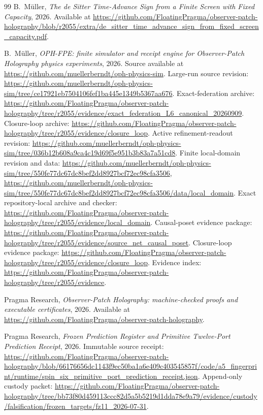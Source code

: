 \begin{thebibliography}{99}
B.~M\"uller,
\emph{The de Sitter Time-Advance Sign from a Finite Screen with Fixed Capacity},
2026.
Available at
\url{https://github.com/FloatingPragma/observer-patch-holography/blob/r2055/extra/de_sitter_time_advance_sign_from_fixed_screen_capacity.pdf}.

B.~M\"uller,
\emph{OPH-FPE: finite simulator and receipt engine for Observer-Patch Holography physics experiments},
2026.
Source available at \url{https://github.com/muellerberndt/oph-physics-sim}.
Large-run source revision:
\url{https://github.com/muellerberndt/oph-physics-sim/tree/ce17921eb7504106fef1ba445e1349b5367aa676}.
Exact-federation archive:
\url{https://github.com/FloatingPragma/observer-patch-holography/tree/r2055/evidence/exact_federation_L6_canonical_20260909}.
Closure-loop archive:
\url{https://github.com/FloatingPragma/observer-patch-holography/tree/r2055/evidence/closure_loop}.
Active refinement-readout revision:
\url{https://github.com/muellerberndt/oph-physics-sim/tree/036b12b608a9ca4c19d69f5e951b3b83a7a51cd8}.
Finite local-domain revision and data:
\url{https://github.com/muellerberndt/oph-physics-sim/tree/550fe77dc67dc8bef2dd8927bcf72ec98cfa3506},
\url{https://github.com/muellerberndt/oph-physics-sim/tree/550fe77dc67dc8bef2dd8927bcf72ec98cfa3506/data/local_domain}.
Exact repository-local archive and checker:
\url{https://github.com/FloatingPragma/observer-patch-holography/tree/r2055/evidence/local_domain}.
Causal-poset evidence package:
\url{https://github.com/FloatingPragma/observer-patch-holography/tree/r2055/evidence/source_net_causal_poset}.
Closure-loop evidence package:
\url{https://github.com/FloatingPragma/observer-patch-holography/tree/r2055/evidence/closure_loop}.
Evidence index:
\url{https://github.com/FloatingPragma/observer-patch-holography/tree/r2055/evidence}.

Pragma Research,
\emph{Observer-Patch Holography: machine-checked proofs and executable certificates},
2026.
Available at \url{https://github.com/FloatingPragma/observer-patch-holography}.

Pragma Research,
\emph{Frozen Prediction Register and Primitive Twelve-Port Prediction Receipt},
2026.
Immutable source receipt:
\url{https://github.com/FloatingPragma/observer-patch-holography/blob/66176656dc1143f9ec50ba1a6e409c403545857f/code/a5_fingerprint/runtime/spin_six_primitive_port_prediction_receipt.json}.
Append-only custody packet:
\url{https://github.com/FloatingPragma/observer-patch-holography/tree/bb73f80d459113ccc82d5a5b5219d1dda78e9a79/evidence/custody/falsification/frozen_targets/fz11_2026-07-31}.


\end{thebibliography}

